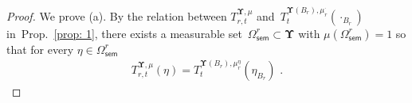 \documentclass[11pt,letterpaper]{amsart}
\newcommand{\Ch}{\mathsf{Ch}}
\newcommand{\diff}{\mathop{}\!\mathrm{d}}
\newcommand{\N}{{\mathbb N}}
\newcommand{\R}{{\mathbb R}}
\newcommand{\comma}{\,\,\mathrm{,}\;\,}
\newcommand{\fstop}{\,\,\mathrm{.}}
\newcommand{\QP}{{\mu}}
\newcommand{\dUpsilon}{{\mathbf \Upsilon}}
\newcommand{\U}{\dUpsilon}
\newcommand{\sine}{\mathsf{sine}}
\renewcommand{\1}{\mathbf 1}
\numberwithin{equation}{section}
\theoremstyle{plain}
\theoremstyle{definition}
\newtheorem{defs}[thm]{Definition}%
\theoremstyle{remark}
\newcommand{\HWI}{{\sf HWI}}
\newcommand{\Fish}[2]{\ensuremath{{\rm I}}_{#1} (#2)}
\begin{document}
\begin{proof}

We prove (a).
By the relation between $T^{\U, \QP}_{r, t}$ and~$T^{\U(B_r), \QP_r^{\cdot}}_t(\cdot_{B_r})$ in~Prop.~\ref{prop: 1}, there exists a measurable set~$\Omega^r_{\mathsf{sem}} \subset \U$ with $\QP(\Omega^r_{\mathsf{sem}})=1$ so that for every $\eta \in \Omega^r_{\mathsf{sem}}$
\begin{align}\label{e:semSO}
T^{\U, \QP}_{r, t}(\eta)=T^{\U(B_r), \QP_r^{\eta}}_t(\eta_{B_r}) \fstop
\end{align}



\end{proof}
\end{document}
